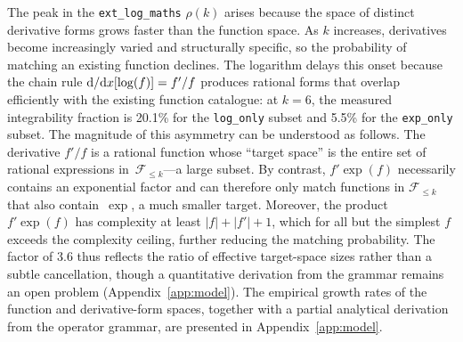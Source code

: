 \documentclass[preprint,12pt,authoryear]{elsarticle}
\newcommand{\Fleq}{\mathcal{F}_{\leq k}}
\newcommand{\rhok}{\rho(k)}
\newcommand{\dd}{{\rm d}}
\newcommand{\hd}[1]{{\color{red}\textbf{[HD: #1]}}}
\begin{document}
The peak in the \texttt{ext\_log\_maths} $\rhok$ arises because the space of distinct derivative forms grows faster than the function space. As $k$ increases, derivatives become increasingly varied and structurally specific, so the probability of matching an existing function declines. The logarithm delays this onset because the chain rule $\dd/\dd x[\log(f)] = f'/f$ produces rational forms that overlap efficiently with the existing function catalogue: at $k=6$, the measured integrability fraction is 20.1\% for the \texttt{log\_only} subset and 5.5\% for the \texttt{exp\_only} subset.
The magnitude of this asymmetry can be understood as follows. The derivative $f'/f$ is a rational function whose ``target space'' is the entire set of rational expressions in~$\Fleq$---a large subset. By contrast, $f'\exp(f)$ necessarily contains an exponential factor and can therefore only match functions in $\Fleq$ that also contain~$\exp$, a much smaller target. Moreover, the product $f'\exp(f)$ has complexity at least $|f| + |f'| + 1$, which for all but the simplest $f$ exceeds the complexity ceiling, further reducing the matching probability. The factor of $3.6$ thus reflects the ratio of effective target-space sizes rather than a subtle cancellation, though a quantitative derivation from the grammar remains an open problem (Appendix~\ref{app:model}). The empirical growth rates of the function and derivative-form spaces, together with a partial analytical derivation from the operator grammar, are presented in Appendix~\ref{app:model}.

\end{document}
